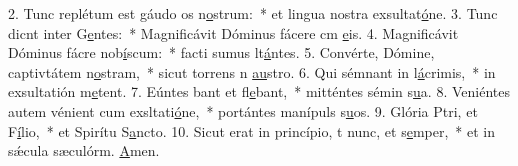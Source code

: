 2. Tunc replétum est gáudo os n\uline{o}strum:~* et lingua nostra exsultat\uline{ó}ne.
3. Tunc dicnt inter G\uline{e}ntes:~* Magnificávit Dóminus fácere cm \uline{e}is.
4. Magnificávit Dóminus fácre nob\uline{í}scum:~* facti sumus lt\uline{á}ntes.
5. Convérte, Dómine, captivtátem n\uline{o}stram,~* sicut torrens n \uline{au}stro.
6. Qui sémnant in l\uline{á}crimis,~* in exsultatión m\uline{e}tent.
7. Eúntes bant et fl\uline{e}bant,~* mitténtes sémin s\uline{u}a.
8. Veniéntes autem vénient cum exsltati\uline{ó}ne,~* portántes manípuls s\uline{u}os.
9. Glória Ptri, et F\uline{í}lio,~* et Spirítu S\uline{a}ncto.
10. Sicut erat in princípio, t nunc, et s\uline{e}mper,~* et in sǽcula sæculórm. \uline{A}men.
